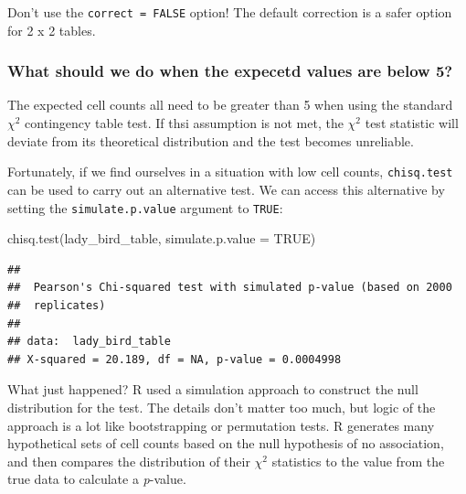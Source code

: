 \documentclass[
]{book}
\newenvironment{Shaded}{\begin{snugshade}}{\end{snugshade}}
\newcommand{\AttributeTok}[1]{\textcolor[rgb]{0.77,0.63,0.00}{#1}}
\newcommand{\ConstantTok}[1]{\textcolor[rgb]{0.00,0.00,0.00}{#1}}
\newcommand{\FunctionTok}[1]{\textcolor[rgb]{0.00,0.00,0.00}{#1}}
\newcommand{\NormalTok}[1]{#1}
\newenvironment{greybox}{
  \definecolor{shadecolor}{rgb}{0.95,0.95,0.95}  %
  \color{black}
  \begin{shaded}}
 {\end{shaded}}
\newenvironment{infobox}[1]
  {
  \begin{itemize}
  \renewcommand{\labelitemi}{
    \raisebox{-.7\height}[0pt][0pt]{
      {\setkeys{Gin}{width=3em,keepaspectratio}
        \texttt{[image: images/\#1]}}
    }
  }
  \setlength{\fboxsep}{1em}
  \begin{greybox}
  \item
  }
  {
  \end{greybox}
  \end{itemize}
  }
\begin{document}
Don't use the \texttt{correct\ =\ FALSE} option! The default correction is a safer option for 2 x 2 tables.

\begin{infobox}{information}

\hypertarget{what-should-we-do-when-the-expecetd-values-are-below-5}{%
\subsubsection*{What should we do when the expecetd values are below 5?}\label{what-should-we-do-when-the-expecetd-values-are-below-5}}

The expected cell counts all need to be greater than 5 when using the standard \(\chi^{2}\) contingency table test. If thsi assumption is not met, the \(\chi^{2}\) test statistic will deviate from its theoretical distribution and the test becomes unreliable.

Fortunately, if we find ourselves in a situation with low cell counts, \texttt{chisq.test} can be used to carry out an alternative test. We can access this alternative by setting the \texttt{simulate.p.value} argument to \texttt{TRUE}:

\begin{Shaded}
\begin{Highlighting}[]
\FunctionTok{chisq.test}\NormalTok{(lady\_bird\_table, }\AttributeTok{simulate.p.value =} \ConstantTok{TRUE}\NormalTok{)}
\end{Highlighting}
\end{Shaded}

\begin{verbatim}
## 
##  Pearson's Chi-squared test with simulated p-value (based on 2000
##  replicates)
## 
## data:  lady_bird_table
## X-squared = 20.189, df = NA, p-value = 0.0004998
\end{verbatim}

What just happened? R used a simulation approach to construct the null distribution for the test. The details don't matter too much, but logic of the approach is a lot like bootstrapping or permutation tests. R generates many hypothetical sets of cell counts based on the null hypothesis of no association, and then compares the distribution of their \(\chi^{2}\) statistics to the value from the true data to calculate a \emph{p}-value.

\end{infobox}
\end{document}
